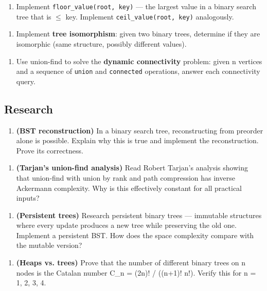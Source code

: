 \begin{enumerate}
\item Implement \texttt{floor\_value(root, key)} — the largest value in a binary search tree that is $\le $ key. Implement \texttt{ceil\_value(root, key)} analogously.
\end{enumerate}

\begin{enumerate}
\item Implement \textbf{tree isomorphism}: given two binary trees, determine if they are isomorphic (same structure, possibly different values).
\end{enumerate}

\begin{enumerate}
\item Use union-find to solve the \textbf{dynamic connectivity} problem: given n vertices and a sequence of \texttt{union} and \texttt{connected} operations, answer each connectivity query.
\end{enumerate}

\subsection{Research}

\begin{enumerate}
\item \textbf{(BST reconstruction)} In a binary search tree, reconstructing from preorder alone is possible. Explain why this is true and implement the reconstruction. Prove its correctness.
\end{enumerate}

\begin{enumerate}
\item \textbf{(Tarjan's union-find analysis)} Read Robert Tarjan's analysis showing that union-find with union by rank and path compression has inverse Ackermann complexity. Why is this effectively constant for all practical inputs?
\end{enumerate}

\begin{enumerate}
\item \textbf{(Persistent trees)} Research persistent binary trees — immutable structures where every update produces a new tree while preserving the old one. Implement a persistent BST. How does the space complexity compare with the mutable version?
\end{enumerate}

\begin{enumerate}
\item \textbf{(Heaps vs. trees)} Prove that the number of different binary trees on n nodes is the Catalan number C\_n = (2n)! / ((n+1)! n!). Verify this for n = 1, 2, 3, 4.
\end{enumerate}

